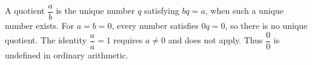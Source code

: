 A quotient $\dfrac{a}{b}$ is the unique number $q$ satisfying $bq=a$, when such a unique number exists. For $a=b=0$, every number satisfies $0q=0$, so there is no unique quotient. The identity $\dfrac{a}{a}=1$ requires $a\ne0$ and does not apply. Thus $\dfrac{0}{0}$ is undefined in ordinary arithmetic.
